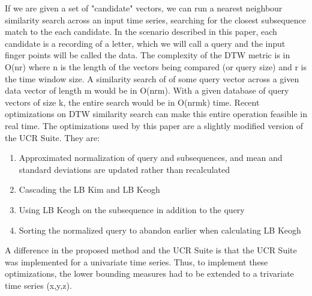 If we are given a set of "candidate" vectors, we can run a nearest neighbour similarity search across an input time series, searching for the closest subsequence match to the each candidate. In the scenario described in this paper, each candidate is a recording of a letter, which we will call a query and the input finger points will be called the data.
The complexity of the DTW metric is in O(nr) where n is the length of the vectors being compared (or query size) and r is the time window size. A similarity search of of some query vector across a given data vector of length m would be in O(nrm). With a given database of query vectors of size k, the entire search would be in O(nrmk) time.
Recent optimizations on DTW similarity search can make this entire operation feasible in real time. The optimizations used by this paper are a slightly modified version of the UCR Suite. They are: 
\begin{enumerate}
\item
Approximated normalization of query and subsequences, and mean and standard deviations are updated rather than recalculated
\item
Cascading the LB Kim and LB Keogh
\item
Using LB Keogh on the subsequence in addition to the query
\item
Sorting the normalized query to abandon earlier when calculating LB Keogh
\end{enumerate}
A difference in the proposed method and the UCR Suite is that the UCR Suite was implemented for a univariate time series. Thus, to implement these optimizations, the lower bounding measures had to be extended to a trivariate time series (x,y,z).~\cite{rath2002lower-bounding}


